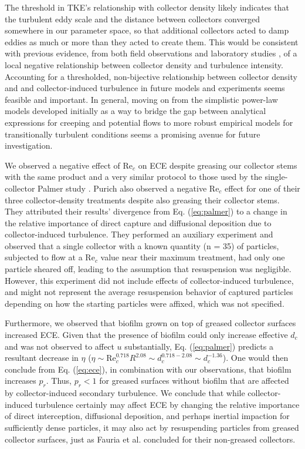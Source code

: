 \documentclass[geosciences,article,submit,moreauthors,pdftex]{Definitions/mdpi}
\newcommand\Rey{\mathrm{Re}}
\begin{document}
The threshold in TKE's relationship with collector density likely indicates that the turbulent eddy scale and the distance between collectors converged somewhere in our parameter space, so that additional collectors acted to damp eddies as much or more than they acted to create them. This would be consistent with previous evidence, from both field observations \cite{leonard1995flow} and laboratory studies \cite{nepf_drag_1999, purich2006capture}, of a local negative relationship between collector density and turbulence intensity. Accounting for a thresholded, non-bijective relationship between collector density and and collector-induced turbulence in future models and experiments seems feasible and important. In general, moving on from the simplistic power-law models developed initially as a way to bridge the gap between analytical expressions for creeping and potential flows to more robust empirical models for transitionally turbulent conditions \cite{stein2020} seems a promising avenue for future investigation.

We observed a negative effect of $\Rey_c$ on ECE despite greasing our collector stems with the same product and a very similar protocol to those used by the single-collector Palmer study \cite{Palmer_2004}. Purich also observed a negative $\Rey_c$ effect for one of their three collector-density treatments despite also greasing their collector stems. They attributed their results' divergence from Eq. (\ref{eq:palmer}) to a change in the relative importance of direct capture and diffusional deposition due to collector-induced turbulence. They performed an auxiliary experiment and observed that a single collector with a known quantity (n = 35) of particles, subjected to flow at a $\Rey_c$ value near their maximum treatment, had only one particle sheared off, leading to the assumption that resuspension was negligible. However, this experiment did not include effects of collector-induced turbulence, and might not represent the average resuspension behavior of captured particles depending on how the starting particles were affixed, which was not specified. 

Furthermore, we observed that biofilm grown on top of greased collector surfaces increased ECE. Given that the presence of biofilm could only increase effective $d_c$ and was not observed to affect $u$ substantially, Eq. (\ref{eq:palmer}) predicts a resultant decrease in $\eta$ ($\eta \sim \Rey_c^{0.718}R^{2.08} \sim d_c^{0.718 - 2.08} \sim d_c^{-1.36}$). One would then conclude from Eq. (\ref{eq:ece}), in combination with our observations, that biofilm increases $p_r$. Thus, $p_r < 1$ for greased surfaces without biofilm that are affected by collector-induced secondary turbulence. We conclude that while collector-induced turbulence certainly may affect ECE by changing the relative importance of direct interception, diffusional deposition, and perhaps inertial impaction for sufficiently dense particles, it may also act by resuspending particles from greased collector surfaces, just as Fauria et al. \cite{Fauria_2015} concluded for their non-greased collectors.
\end{document}
